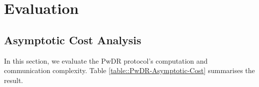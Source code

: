 
\section{Evaluation}









\subsection{Asymptotic Cost Analysis} In this section, we evaluate the PwDR protocol’s computation and communication complexity. Table \ref{table::PwDR-Asymptotic-Cost} summarises the result. 





